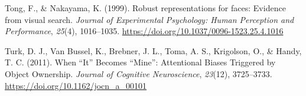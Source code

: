 \documentclass[
  man]{apa6}
\newlength{\cslhangindent}
\newenvironment{CSLReferences}[2] %
 {\begin{list}{}{%
  \setlength{\itemindent}{0pt}
  \setlength{\leftmargin}{0pt}
  \setlength{\parsep}{0pt}
  \ifodd #1
   \setlength{\leftmargin}{\cslhangindent}
   \setlength{\itemindent}{-1\cslhangindent}
  \fi
  \setlength{\itemsep}{#2\baselineskip}}}
 {\end{list}}
\begin{document}
\begin{CSLReferences}{1}{0}
Tong, F., \& Nakayama, K. (1999). Robust representations for faces: {Evidence} from visual search. \emph{Journal of Experimental Psychology: Human Perception and Performance}, \emph{25}(4), 1016--1035. \url{https://doi.org/10.1037/0096-1523.25.4.1016}

Turk, D. J., Van Bussel, K., Brebner, J. L., Toma, A. S., Krigolson, O., \& Handy, T. C. (2011). When {``{It}''} {Becomes} {``{Mine}''}: {Attentional Biases Triggered} by {Object Ownership}. \emph{Journal of Cognitive Neuroscience}, \emph{23}(12), 3725--3733. \url{https://doi.org/10.1162/jocn_a_00101}

\end{CSLReferences}
\end{document}
